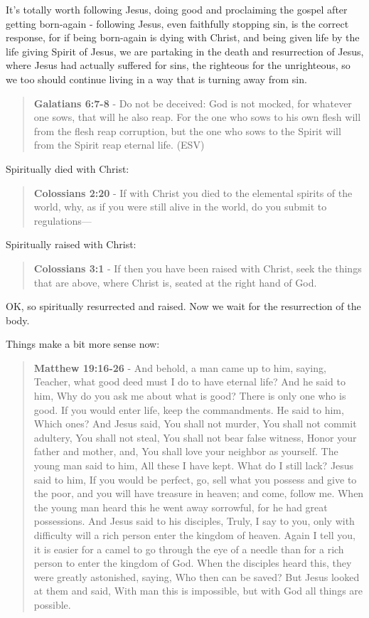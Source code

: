 \documentclass[11pt]{article}
\begin{document}
It's totally worth following Jesus, doing good and proclaiming the gospel after getting born-again - following Jesus, even faithfully stopping sin, is the correct response,
for if being born-again is dying with Christ, and being given life by the life giving Spirit of Jesus,
we are partaking in the death and resurrection of Jesus, where Jesus had actually suffered for sins, the righteous for the unrighteous, so we too should continue living in a way that is turning away from sin.

\begin{quote}
\textbf{Galatians 6:7-8} - Do not be deceived: God is not mocked, for whatever one sows, that will he also reap. For the one who sows to his own flesh will from the flesh reap corruption, but the one who sows to the Spirit will from the Spirit reap eternal life. (ESV)
\end{quote}

Spiritually died with Christ:

\begin{quote}
\textbf{Colossians 2:20} - If with Christ you died to the elemental spirits of the world, why, as if you were still alive in the world, do you submit to regulations—
\end{quote}

Spiritually raised with Christ:

\begin{quote}
\textbf{Colossians 3:1} - If then you have been raised with Christ, seek the things that are above, where Christ is, seated at the right hand of God.
\end{quote}

OK, so spiritually resurrected and raised. Now we wait for the resurrection of the body.

Things make a bit more sense now:

\begin{quote}
\textbf{Matthew 19:16-26} - And behold, a man came up to him, saying, Teacher, what good deed must I do to have eternal life? And he said to him, Why do you ask me about what is good? There is only one who is good. If you would enter life, keep the commandments. He said to him, Which ones? And Jesus said, You shall not murder, You shall not commit adultery, You shall not steal, You shall not bear false witness, Honor your father and mother, and, You shall love your neighbor as yourself. The young man said to him, All these I have kept. What do I still lack? Jesus said to him, If you would be perfect, go, sell what you possess and give to the poor, and you will have treasure in heaven; and come, follow me. When the young man heard this he went away sorrowful, for he had great possessions. And Jesus said to his disciples, Truly, I say to you, only with difficulty will a rich person enter the kingdom of heaven. Again I tell you, it is easier for a camel to go through the eye of a needle than for a rich person to enter the kingdom of God. When the disciples heard this, they were greatly astonished, saying, Who then can be saved? But Jesus looked at them and said, With man this is impossible, but with God all things are possible.
\end{quote}
\end{document}
